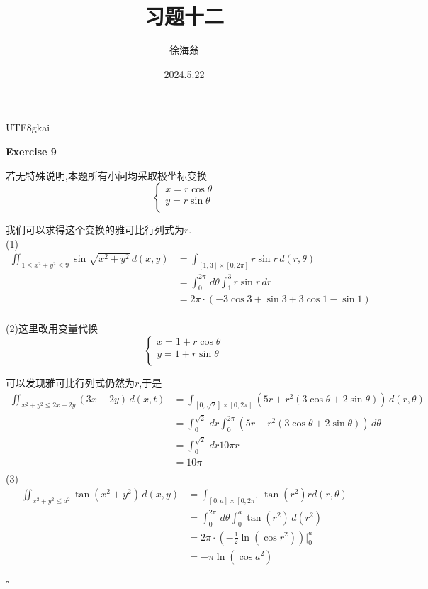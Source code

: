 \documentclass[11pt,hyperref,a4paper,UTF8]{ctexart}
\title{习题十二}
\author{徐海翁}
\date{2024.5.22}
\newenvironment{exercise}[1]{%
{\textbf{Exercise #1} \\ 
    }
}{
  \hfill $\square$ 
  \par\bigskip 
}
\begin{document}
\begin{CJK}{UTF8}{gkai}

\maketitle
\begin{exercise}{9}
    若无特殊说明,本题所有小问均采取极坐标变换
    \[\begin{cases}
        x = r\cos \theta\\
        y = r\sin \theta\\
    \end{cases}\]

    我们可以求得这个变换的雅可比行列式为$r$.\\

    (1)
    \[
    \begin{aligned}
    \iint_{1 \leq x^2 + y^2 \leq 9} \sin \sqrt{x^2 + y^2}\, d(x,y) &= \int_{[1,3]\times[0,2\pi]} r\sin r \, d(r,\theta)\\
    &= \int_{0}^{2\pi}\, d\theta \int_{1}^{3} r\sin r\, dr\\
    &= 2\pi \cdot (-3\cos 3 + \sin 3 + 3\cos 1 - \sin 1)\\
    \end{aligned}
    \]

    (2)这里改用变量代换
    \[\begin{cases}
        x = 1 + r\cos \theta\\
        y = 1 + r\sin \theta\\
    \end{cases}\]

    可以发现雅可比行列式仍然为$r$,于是
    \[
    \begin{aligned}
    \iint_{x^2 + y^2 \leq 2x + 2y}(3x + 2y)\, d(x,t)&= \int_{[0,\sqrt{2}]\times[0,2\pi]} (5r + r^2(3\cos \theta + 2\sin\theta)) \, d(r,\theta)\\
    &= \int_{0}^{\sqrt{2}}\, dr \int_{0}^{2\pi} (5r + r^2(3\cos \theta + 2\sin\theta))\, d\theta\\
    &= \int_{0}^{\sqrt{2}}\, dr 10\pi r\\
    &= 10\pi\\
    \end{aligned}  
    \]
    (3)
    \[\begin{aligned}
        \iint_{x^2 + y^2 \leq a^2} \tan(x^2 + y^2)\,d(x,y) &= \int_{[0,a]\times[0,2\pi]} \tan(r^2) r d(r,\theta)\\
        &= \int_{0}^{2\pi}\,d\theta \int_{0}^{a}\tan(r^2) \, d(r^2)\\
        &= 2\pi \cdot (-\frac{1}{2}\ln(\cos r^2))\bigg|_0^a\\
        &= -\pi \ln(\cos a^2)\\
    \end{aligned}\]


\end{exercise}
\end{CJK}
\end{document}
